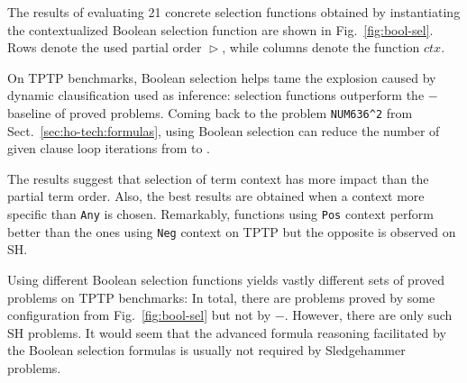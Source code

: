 \documentclass[smallcondensed,draft]{svjour3}     %
\begin{document}
The results of evaluating 21 concrete selection functions obtained
by instantiating the contextualized Boolean selection function are shown in
Fig.~\ref{fig:bool-sel}. Rows denote the used partial order $\vartriangleright$,
while columns denote the function $\mathit{ctx}$.

On TPTP benchmarks, Boolean selection helps tame the explosion caused by
dynamic clausification used as inference:  selection functions
outperform the $-$ baseline of  proved problems. Coming back to the problem
\texttt{NUM636\^{}2} from Sect.~\ref{sec:ho-tech:formulas}, using Boolean selection
can reduce the number of given clause loop iterations from
 to .

The results suggest that selection of term context has more impact
than the partial term order. %
Also, the best results are obtained when a context more specific than \texttt{Any}
is chosen. Remarkably, functions using \texttt{Pos} context
perform better than the ones using \texttt{Neg} context
on TPTP but the opposite is observed on SH.


Using different Boolean selection functions yields vastly different sets of
proved problems on TPTP benchmarks: In total, there are  problems
proved by some configuration from Fig.~\ref{fig:bool-sel} but not by
$-$. However, there are only  such SH problems.
It would seem that the advanced formula reasoning facilitated by the Boolean
selection formulas is usually not required by Sledgehammer problems.
\end{document}
